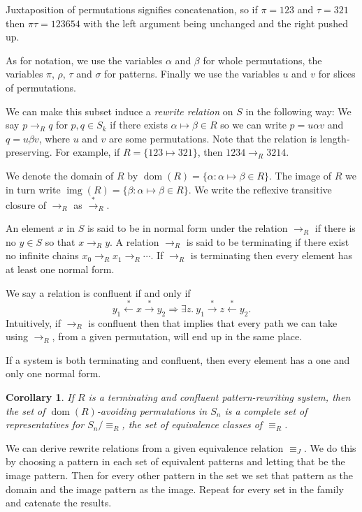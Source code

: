 \documentclass[a4paper, 11pt, english]{article}
\newcommand{\patternrule}{ \mapsto \!}
\newtheorem{corollary}[theorem]{Corollary}
\theoremstyle{definition}
\newcommand{\Sym}{S}
\newcommand{\from}{\leftarrow}
\newcommand{\tostar}{\stackrel{*}{\to}}
\newcommand{\fromstar}{\stackrel{*}{\from}}
\DeclareMathOperator{\dom}{dom}
\DeclareMathOperator{\img}{img}
\begin{document}
Juxtaposition of permutations signifies concatenation, so if $\pi=123$ and
$\tau=321$ then $\pi\tau=123654$ with the left argument being unchanged and the
right pushed up.

As for notation, we use the variables $\alpha$ and $\beta$ for whole permutations, 
the variables $\pi$, $\rho$, $\tau$ and $\sigma$ for patterns.
Finally we use the variables $u$ and $v$ for slices of permutations.

We can make this subset induce a \emph{rewrite relation} on $\Sym$ in the following way: We say
$p \to_R q$ for $p, q \in \Sym_k$ if there exists $\alpha \patternrule \beta \in R$ so
we can write $p = u \alpha v$ and $q = u \beta v$, where
$u$ and $v$ are some permutations.  Note that the relation is
length-preserving. For example, if $R = \{123 \patternrule 321\}$, then $1234 \to_R 3214$. 

We denote the domain of $R$ by $\dom(R) = \{\alpha : \alpha \patternrule
\beta \in R\}$. The image of $R$ we in turn write $\img(R) = \{\beta : \alpha
\patternrule \beta \in R\}$. We write the reflexive transitive closure of
$\to_R$ as $\tostar_R$. 

An element $x$ in $\Sym$ is said to be in normal form under the relation $\to_R$
if there is no $y \in \Sym$ so that $x \to_R y$. A relation $\to_R$ is said to be
terminating if there exist no infinite chains $x_0 \to_R x_1 \to_R \cdots$. If
$\to_R$ is terminating then every element has at least one normal form. 

We say a relation is confluent if and only if
$$
    y_1 \fromstar x \tostar y_2 \Longrightarrow 
    \exists z. \  y_1 \tostar z \fromstar y_2.
$$
Intuitively, if $\to_R$ is confluent then that implies that every path we can
take using $\to_R$, from a given permutation, will end up in the same place. 

If a system is both terminating and confluent, then every element has a one and
only one normal form.

\begin{corollary}
    If $R$ is a terminating and confluent pattern-rewriting system, then the set
    of $\dom(R)$-avoiding permutations in $S_n$ is a complete set of
    representatives for $S_n / \equiv_R$, the set of equivalence classes of
    $\equiv_R$.
\end{corollary}

We can derive rewrite relations from a given equivalence relation $\equiv_J$.
We do this by choosing a pattern in each set of equivalent patterns and letting
that be the image pattern. Then for every other pattern in the set we set that
pattern as the domain and the image pattern as the image. Repeat for every set
in the family and catenate the results.
\end{document}
